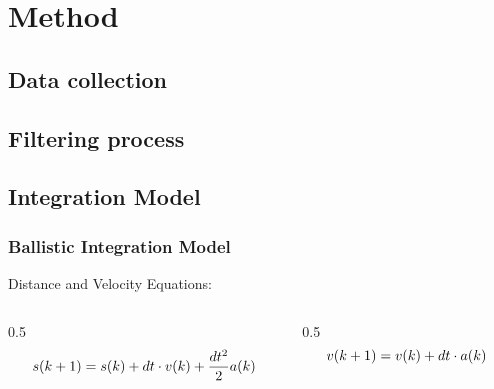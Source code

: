 
\section{Method}

\subsection{Data collection}

\subsection{Filtering process}

\subsection{Integration Model}


\begin{frame}
  \frametitle{Ballistic Integration Model }

    Distance and Velocity Equations:
    \begin{columns}[c]
        \begin{column}{0.5\hsize}\centering
        $$ \small s(k+1) = s(k) + dt \cdot v(k) + \frac{dt^2}{2} a(k) $$    
        \end{column}

        \begin{column}{0.5\hsize}
        $$ \small v(k+1) = v(k) + dt \cdot a(k) $$
        \end{column}
    \end{columns}
 
    \hfil

    \hfil

    \hfil

\end{frame}


